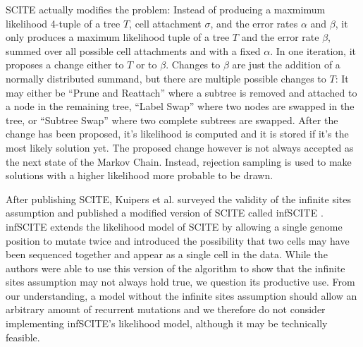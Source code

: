 \ac{SCITE} actually modifies the problem: Instead of producing a maxmimum likelihood 4-tuple of a tree $T$, cell attachment $\sigma$, and the error rates $\alpha$ and $\beta$, it only produces a maximum likelihood tuple of a tree $T$ and the error rate $\beta$, summed over all possible cell attachments and with a fixed $\alpha$. In one iteration, it proposes a change either to $T$ or to $\beta$. Changes to $\beta$ are just the addition of a normally distributed summand, but there are multiple possible changes to $T$: It may either be ``Prune and Reattach'' where a subtree is removed and attached to a node in the remaining tree, ``Label Swap'' where two nodes are swapped in the tree, or ``Subtree Swap'' where two complete subtrees are swapped. After the change has been proposed, it's likelihood is computed and it is stored if it's the most likely solution yet. The proposed change however is not always accepted as the next state of the Markov Chain. Instead, rejection sampling is used to make solutions with a higher likelihood more probable to be drawn.

After publishing \ac{SCITE}, Kuipers et al. surveyed the validity of the infinite sites assumption and published a modified version of \ac{SCITE} called \ac{infSCITE} \cite{kuipers2017single}. \ac{infSCITE} extends the likelihood model of \ac{SCITE} by allowing a single genome position to mutate twice and introduced the possibility that two cells may have been sequenced together and appear as a single cell in the data. While the authors were able to use this version of the algorithm to show that the infinite sites assumption may not always hold true, we question its productive use. From our understanding, a model without the infinite sites assumption should allow an arbitrary amount of recurrent mutations and we therefore do not consider implementing \ac{infSCITE}'s likelihood model, although it may be technically feasible.